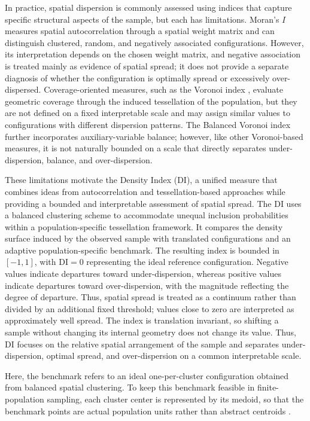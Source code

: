\documentclass[12pt]{imsart}
\theoremstyle{plain}
\theoremstyle{remark}
\begin{document}
In practice, spatial dispersion is commonly assessed using indices that
capture specific structural aspects of the sample, but each has limitations.
Moran's \(I\) \citep{moran1950notes,til:dic:esp:giu:18} measures spatial
autocorrelation through a spatial weight matrix and can distinguish clustered,
random, and negatively associated configurations. However, its interpretation
depends on the chosen weight matrix, and negative association is treated
mainly as evidence of spatial spread; it does not provide a separate diagnosis
of whether the configuration is optimally spread or excessively over-dispersed.
Coverage-oriented measures, such as the Voronoi index
\citep{Stev:Olse:spat:2004}, evaluate geometric coverage through the induced
tessellation of the population, but they are not defined on a fixed
interpretable scale and may assign similar values to configurations with
different dispersion patterns. The Balanced Voronoi index
\citep{prentius2024spatial} further incorporates auxiliary-variable balance;
however, like other Voronoi-based measures, it is not naturally bounded on a
scale that directly separates under-dispersion, balance, and over-dispersion.

These limitations motivate the Density Index (DI), a unified
measure that combines ideas from autocorrelation and tessellation-based
approaches while providing a bounded and interpretable assessment of spatial
spread. The DI uses a balanced clustering scheme to accommodate unequal
inclusion probabilities within a population-specific tessellation framework.
It compares the density surface induced by the observed sample with translated
configurations and an adaptive population-specific benchmark. The resulting index is bounded in \([-1,1]\), with
\(\mathrm{DI}=0\) representing the ideal reference configuration. Negative
values indicate departures toward under-dispersion, whereas positive values
indicate departures toward over-dispersion, with the magnitude reflecting the
degree of departure. Thus, spatial spread is treated as a continuum rather
than divided by an additional fixed threshold; values close to zero are
interpreted as approximately well spread. The index is translation invariant, so shifting a sample without changing its internal geometry does not change its value. Thus, DI focuses on the relative spatial arrangement of the sample and
separates under-dispersion, optimal spread, and over-dispersion on a
common interpretable scale.

Here, the benchmark refers to an ideal one-per-cluster configuration obtained
from balanced spatial clustering. To keep this benchmark feasible in
finite-population sampling, each cluster center is represented by its medoid,
so that the benchmark points are actual population units rather than abstract
centroids \citep{kaufman1990finding}.
\end{document}

